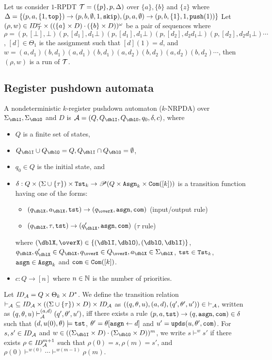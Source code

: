 \begin{example}
\label{ex: RPDT}
Let us consider $1$-RPDT
${\cal T} = (\{p\},p,\Delta)$
over $\{a\},\{b\}$ and $\{z\}$ where
$\Delta = \{
(p, a, \{1,\mathtt{top}\}) \rightarrow (p, b, \emptyset, 1, \mathtt{skip}),
(p, a, \emptyset) \rightarrow (p, b, \{1\}, 1, \mathtt{push}(1))
\}$
Let $(\rho,w)\in \mathit{ID}_{\cal T}^\omega\times ((\{a\}\times D)\cdot(\{b\}\times D))^\omega$
be a pair of sequences where
$\rho=(p,[\bot],\bot)(p,[d_1],d_1\bot)(p,[d_1],d_1\bot)(p,[d_2],d_2d_1\bot)(p,[d_2],d_2d_1\bot)\cdots$
, $[d]\in\Theta_1$ is the assignment such that $[d](1)=d$,
and
$w=(a,d_1)(b,d_1)(a,d_1)(b,d_1)(a,d_2)(b,d_2)(a,d_2)(b,d_2)\cdots$,
then $(\rho,w)$ is a run of ${\cal T}$.
\end{example}

\subsection{Register pushdown automata}\label{sec:RA}
\begin{definition}
A nondeterministic $k$-register pushdown automaton ($k$-NRPDA) over $\Sigma_\dblI,\Sigma_\dblO$ and $D$ is $\calA=(Q, Q_\dblI, Q_\dblO, q_0, \delta, c)$, where
\begin{itemize}
\item $Q$ is a finite set of states,
\item $Q_\dblI\cup Q_\dblO = Q, Q_\dblI\cap Q_\dblO = \emptyset$,
\item $q_0\in Q$ is the initial state, and
\item $\delta: Q \times (\Sigma\cup\{\tau\})\times \mathtt{Tst}_k \to \mathscr{P}(Q \times\mathtt{Asgn}_k\times \mathtt{Com}([k]))$ is a transition function having one of the forms:
\begin{itemize}
\item $(q_\dblX,a_\dblX,\tst)\to(q_\overX,\asgn,\com)$ (input/output rule)
\item $(q_\dblX,\tau,\tst)\to(q'_\dblX,\asgn,\com)$ ($\tau$ rule)
\end{itemize}
where $(\dblX, \overX)\in\{(\dblI, \dblO), (\dblO,\dblI)\}$,
$q_\dblX, q'_\dblX\in Q_\dblX, q_\overX\in Q_\overX, a_\dblX\in \Sigma_\dblX$, $\mathtt{tst}\in\mathtt{Tst}_k$, $\mathtt{asgn}\in\mathtt{Asgn}_k$ and $\mathtt{com}\in\mathtt{Com}([k])$.
\item $c: Q \to [n]$ where $n\in \mathbb{N}$ is the number of priorities.
\end{itemize}
\end{definition}
\noindent
Let $\mathit{ID}_{\cal A}= Q\times \Theta_k\times D^*$.
We define the transition relation $\vdash_{\cal A}\ \subseteq\mathit{ID}_{\cal A}\times ((\Sigma\cup\{\tau\})\times D)\times \mathit{ID}_{\cal A}$ as
$((q,\theta,u), (a,d), (q',\theta',u'))\in\ \vdash_\calA$,
written as $(q,\theta,u)\vdash^{(a,d)}_{{\cal A}}(q',\theta',u')$, iff
there exists a rule $(p, a, \mathtt{tst}) \to (q, \mathtt{asgn}, \mathtt{com}) \in \delta$
such that
$(d, u(0), \theta)\models\mathtt{tst}$, $\theta' = \theta[\mathtt{asgn}\leftarrow d]$ and
$u'= \mathtt{upds}(u,\theta',\mathtt{com})$.
For $s,s'\in\mathit{ID}_{\cal A}$ and
$w\in((\Sigma_\dblI\times D)\cdot (\Sigma_\dblO\times D))^{m}$,
we write $s\vdash^{w}s'$ if
there exists $\rho\in\mathit{ID}_{\cal A}^{m+1}$ such that
$\rho(0)=s, \rho(m)=s'$, and
$\rho(0)\vdash^{w(0)}\cdots\vdash^{w(m-1)}\rho(m)$.

